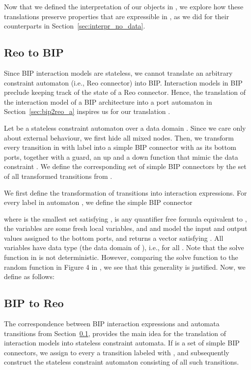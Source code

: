 \documentclass[submission,copyright,creativecommons,hidelinks]{eptcs}
\theoremstyle{plain} \newtheorem{theorem}{Theorem}
\theoremstyle{definition}
\theoremstyle{remark}
\newcommand{\secn}[1]{Section~\ref{sec:#1}}
\begin{document}
Now that we defined the interpretation of our objects in , we explore how these translations preserve properties that are expressible in , as we did for their counterparts in \secn{interpr_no_data}.

\subsection{Reo to BIP}
\label{sec:reotobip_nodata}
Since BIP interaction models are stateless, we cannot translate an arbitrary constraint automaton (i.e., Reo connector) into BIP. Interaction models in BIP preclude keeping track of the state of a Reo connector. Hence, the translation of the interaction model of a BIP architecture into a port automaton in \secn{bip2reo_a} inspires us for our translation .

Let  be a stateless constraint automaton over a data domain . Since we care only about external behaviour, we first hide all mixed nodes. 
Then, we transform every transition in  with label  into a simple BIP connector with  as its bottom ports, together with a guard, an up and a down function that mimic the data constraint . We define the corresponding set  of simple BIP connectors by the set of all transformed transitions from .

We first define the transformation of transitions into interaction expressions. For every label  in automaton , we define the simple BIP connector
 
where  is the smallest set satisfying ,  is any quantifier free formula equivalent to , the variables  are some fresh local variables, and  and  model the input and output values assigned to the bottom ports, and  returns a vector  satisfying . All variables have data type  (the data domain of ), i.e.,  for all .
Note that the solve function in  is not deterministic. However, comparing the solve function to the random function in Figure 4 in \cite{BBJS14}, we see that this generality is justified.
Now, we define  as follows:


\subsection{BIP to Reo}
The correspondence between BIP interaction expressions and automata transitions from \secn{reotobip_nodata}, provides the main idea for the translation of interaction models into stateless constraint automata. If  is a set of simple BIP connectors, we assign to every  a transition  labeled with , and subsequently construct the stateless constraint automaton consisting of all such  transitions.
\end{document}
